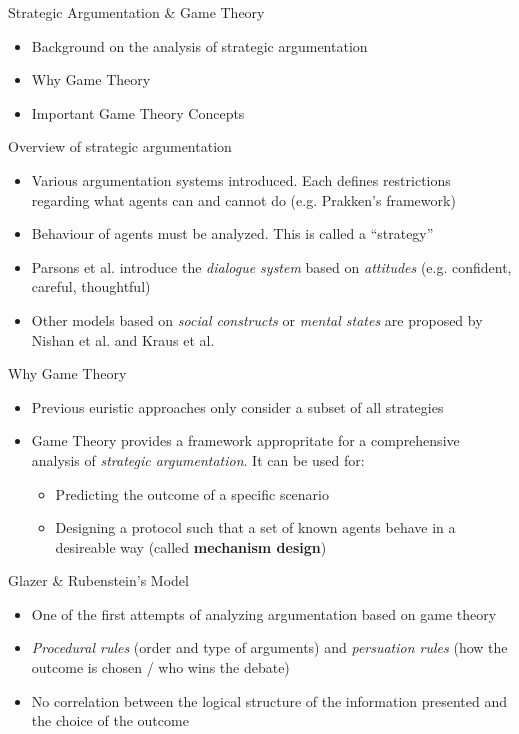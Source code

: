 \documentclass{beamer}
\begin{document}
\begin{frame}{Strategic Argumentation \& Game Theory}
\begin{itemize}
    \item Background on the analysis of strategic argumentation
    \item Why Game Theory
    \item Important Game Theory Concepts
\end{itemize}
\end{frame}

\begin{frame}{Overview of strategic argumentation}
\begin{itemize}
    \pause
    \item Various argumentation systems introduced. Each defines restrictions regarding what agents can and cannot do (e.g. Prakken's framework) \pause
    \item Behaviour of agents must be analyzed. This is called a ``strategy'' \pause
    \item Parsons et al. introduce the \emph{dialogue system} based on \emph{attitudes} (e.g. confident, careful, thoughtful) \pause
    \item Other models based on \emph{social constructs} or \emph{mental states} are proposed by Nishan et al. and Kraus et al.
\end{itemize}
\end{frame}

\begin{frame}{Why Game Theory}
\begin{itemize}
    \pause
    \item Previous euristic approaches only consider a subset of all strategies \pause
    \item Game Theory provides a framework appropritate for a comprehensive analysis of \emph{strategic argumentation}. It can be used for:\pause
    \begin{itemize}
        \item Predicting the outcome of a specific scenario\pause
        \item Designing a protocol such that a set of known agents behave
            in a desireable way (called \textbf{mechanism design})
    \end{itemize}
\end{itemize}
\end{frame}

\begin{frame}{Glazer \& Rubenstein's Model}
\begin{itemize}
    \item One of the first attempts of analyzing argumentation based on game theory
    \item \emph{Procedural rules} (order and type of arguments) and \emph{persuation rules} (how the outcome is chosen / who wins the debate)
    \item No correlation between the logical structure of the information presented and the choice of the outcome
\end{itemize}
\end{frame}
\end{document}
